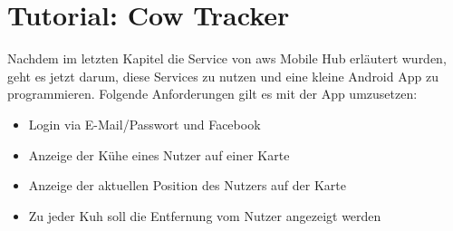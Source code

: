 \section{Tutorial: Cow Tracker}
Nachdem im letzten Kapitel die Service von \gls{aws} Mobile Hub erläutert wurden, geht es jetzt darum, diese Services zu nutzen und eine kleine Android App zu programmieren. Folgende Anforderungen gilt es mit der App umzusetzen:
\begin{itemize}
	\item Login via E-Mail/Passwort und Facebook
	\item Anzeige der Kühe eines Nutzer auf einer Karte
	\item Anzeige der aktuellen Position des Nutzers auf der Karte
	\item Zu jeder Kuh soll die Entfernung vom Nutzer angezeigt werden	 
\end{itemize}
